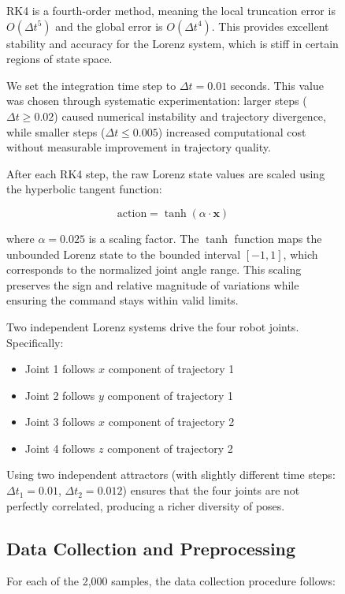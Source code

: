 \documentclass[12pt,a4paper,oneside]{report}
\begin{document}
\begin{figure}[H]
RK4 is a fourth-order method, meaning the local truncation error is $O(\Delta t^5)$ and the global error is $O(\Delta t^4)$. This provides excellent stability and accuracy for the Lorenz system, which is stiff in certain regions of state space.

We set the integration time step to $\Delta t = 0.01$ seconds. This value was chosen through systematic experimentation: larger steps ($\Delta t \geq 0.02$) caused numerical instability and trajectory divergence, while smaller steps ($\Delta t \leq 0.005$) increased computational cost without measurable improvement in trajectory quality.

After each RK4 step, the raw Lorenz state values are scaled using the hyperbolic tangent function:

\begin{equation}
\text{action} = \tanh(\alpha \cdot \mathbf{x})
\end{equation}

where $\alpha = 0.025$ is a scaling factor. The $\tanh$ function maps the unbounded Lorenz state to the bounded interval $[-1, 1]$, which corresponds to the normalized joint angle range. This scaling preserves the sign and relative magnitude of variations while ensuring the command stays within valid limits.

Two independent Lorenz systems drive the four robot joints. Specifically:

\begin{itemize}
    \item Joint 1 follows $x$ component of trajectory 1
    \item Joint 2 follows $y$ component of trajectory 1
    \item Joint 3 follows $x$ component of trajectory 2
    \item Joint 4 follows $z$ component of trajectory 2
\end{itemize}

Using two independent attractors (with slightly different time steps: $\Delta t_1 = 0.01$, $\Delta t_2 = 0.012$) ensures that the four joints are not perfectly correlated, producing a richer diversity of poses.

\subsection{Data Collection and Preprocessing}

For each of the 2,000 samples, the data collection procedure follows:


\end{figure}
\end{document}
